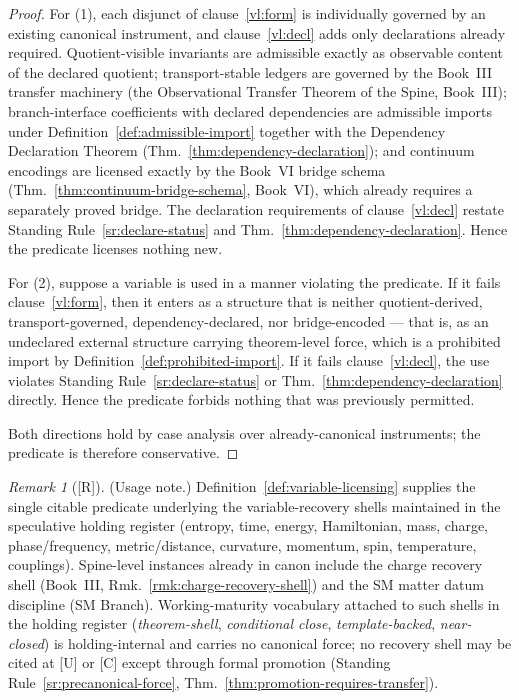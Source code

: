 \documentclass[12pt,oneside]{amsbook}
\theoremstyle{plain}
\theoremstyle{definition}
\theoremstyle{remark}
\newtheorem{remark}[theorem]{Remark}
\newcommand{\status}[1]{\textup{[#1]}}
\begin{document}
\begin{proof}
For (1), each disjunct of clause~\ref{vl:form} is individually
governed by an existing canonical instrument, and clause~\ref{vl:decl}
adds only declarations already required.  Quotient-visible invariants
are admissible exactly as observable content of the declared quotient;
transport-stable ledgers are governed by the Book~III transfer
machinery (the Observational Transfer Theorem of the Spine,
Book~III); branch-interface
coefficients with declared dependencies are admissible imports under
Definition~\ref{def:admissible-import} together with the Dependency
Declaration Theorem (Thm.~\ref{thm:dependency-declaration}); and
continuum encodings are licensed exactly by the Book~VI bridge schema
(Thm.~\ref{thm:continuum-bridge-schema}, Book~VI), which already
requires a separately proved bridge.  The declaration requirements of
clause~\ref{vl:decl} restate Standing
Rule~\ref{sr:declare-status} and
Thm.~\ref{thm:dependency-declaration}.  Hence the predicate licenses
nothing new.

For (2), suppose a variable is used in a manner violating the
predicate.  If it fails clause~\ref{vl:form}, then it enters as a
structure that is neither quotient-derived, transport-governed,
dependency-declared, nor bridge-encoded --- that is, as an undeclared
external structure carrying theorem-level force, which is a
prohibited import by Definition~\ref{def:prohibited-import}.  If it
fails clause~\ref{vl:decl}, the use violates Standing
Rule~\ref{sr:declare-status} or
Thm.~\ref{thm:dependency-declaration} directly.  Hence the predicate
forbids nothing that was previously permitted.

Both directions hold by case analysis over already-canonical
instruments; the predicate is therefore conservative.
\end{proof}

\begin{remark}[\status{R}]\label{rmk:variable-licensing-usage}
\textup{(Usage note.)}
Definition~\ref{def:variable-licensing} supplies the single citable
predicate underlying the variable-recovery shells maintained in the
speculative holding register (entropy, time, energy, Hamiltonian,
mass, charge, phase/frequency, metric/distance, curvature, momentum,
spin, temperature, couplings).  Spine-level instances already in
canon include the charge recovery shell
(Book~III, Rmk.~\ref{rmk:charge-recovery-shell}) and the SM matter
datum discipline (SM Branch).  Working-maturity vocabulary attached
to such shells in the holding register (\emph{theorem-shell},
\emph{conditional close}, \emph{template-backed},
\emph{near-closed}) is holding-internal and carries no canonical
force; no recovery shell may be cited at [U] or [C] except through
formal promotion (Standing Rule~\ref{sr:precanonical-force},
Thm.~\ref{thm:promotion-requires-transfer}).
\end{remark}
\end{document}
